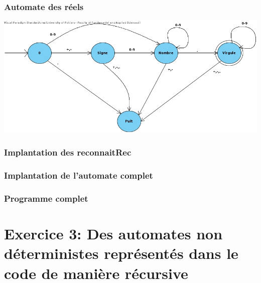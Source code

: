 \documentclass[./standalone.tex]{subfiles}
\begin{document}
\subsubsection{Automate des réels}
\medskip
\begin{center}
	\includegraphics[scale=0.5]{../VP/ex2_2.jpg}
\end{center}
\newpage

\subsubsection{Implantation des reconnaitRec}



\subsubsection{Implantation de l'automate complet}



\subsubsection{Programme complet}

\newpage




\section{Exercice 3: Des automates non déterministes représentés dans le code de manière récursive}
\bigskip
\end{document}
